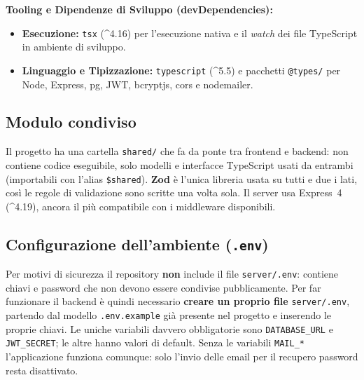 \textbf{Tooling e Dipendenze di Sviluppo (devDependencies):}
\begin{itemize}[itemsep=-2pt]
    \item \textbf{Esecuzione:} \texttt{tsx} (\textasciicircum{}4.16) per l'esecuzione nativa e il \textit{watch} dei file TypeScript in ambiente di sviluppo.
    \item \textbf{Linguaggio e Tipizzazione:} \texttt{typescript} (\textasciicircum{}5.5) e pacchetti \texttt{@types/} per Node, Express, pg, JWT, bcryptjs, cors e nodemailer.
\end{itemize}

\subsection{Modulo condiviso}
Il progetto ha una cartella \texttt{shared/} che fa da ponte tra frontend e backend: non contiene codice eseguibile, solo modelli e interfacce TypeScript usati da entrambi (importabili con l'alias \texttt{\$shared}). \textbf{Zod} è l'unica libreria usata su tutti e due i lati, così le regole di validazione sono scritte una volta sola. Il server usa Express~4 (\textasciicircum{}4.19), ancora il più compatibile con i middleware disponibili.

\subsection{Configurazione dell'ambiente (\texttt{.env})}
Per motivi di sicurezza il repository \textbf{non} include il file \texttt{server/.env}: contiene chiavi e password che non devono essere condivise pubblicamente. Per far funzionare il backend è quindi necessario \textbf{creare un proprio file} \texttt{server/.env}, partendo dal modello \texttt{.env.example} già presente nel progetto e inserendo le proprie chiavi. Le uniche variabili davvero obbligatorie sono \texttt{DATABASE\_URL} e \texttt{JWT\_SECRET}; le altre hanno valori di default. Senza le variabili \texttt{MAIL\_*} l'applicazione funziona comunque: solo l'invio delle email per il recupero password resta disattivato.

